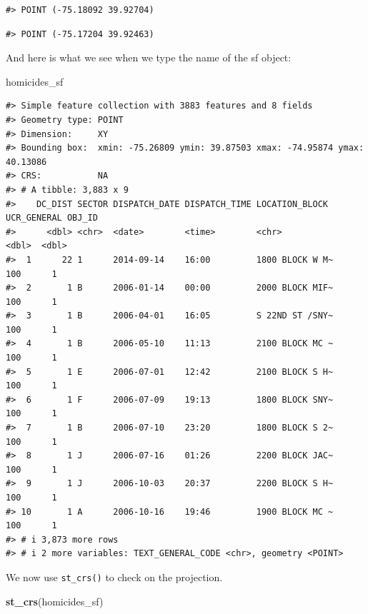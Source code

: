 \documentclass[
]{book}
\newenvironment{Shaded}{\begin{snugshade}}{\end{snugshade}}
\newcommand{\FunctionTok}[1]{\textcolor[rgb]{0.13,0.29,0.53}{\textbf{#1}}}
\newcommand{\NormalTok}[1]{#1}
\begin{document}
\begin{verbatim}
#> POINT (-75.18092 39.92704)
\end{verbatim}

\begin{verbatim}
#> POINT (-75.17204 39.92463)
\end{verbatim}

And here is what we see when we type the name of the sf object:

\begin{Shaded}
\begin{Highlighting}[]
\NormalTok{homicides\_sf}
\end{Highlighting}
\end{Shaded}

\begin{verbatim}
#> Simple feature collection with 3883 features and 8 fields
#> Geometry type: POINT
#> Dimension:     XY
#> Bounding box:  xmin: -75.26809 ymin: 39.87503 xmax: -74.95874 ymax: 40.13086
#> CRS:           NA
#> # A tibble: 3,883 x 9
#>    DC_DIST SECTOR DISPATCH_DATE DISPATCH_TIME LOCATION_BLOCK  UCR_GENERAL OBJ_ID
#>      <dbl> <chr>  <date>        <time>        <chr>                 <dbl>  <dbl>
#>  1      22 1      2014-09-14    16:00         1800 BLOCK W M~         100      1
#>  2       1 B      2006-01-14    00:00         2000 BLOCK MIF~         100      1
#>  3       1 B      2006-04-01    16:05         S 22ND ST /SNY~         100      1
#>  4       1 B      2006-05-10    11:13         2100 BLOCK MC ~         100      1
#>  5       1 E      2006-07-01    12:42         2100 BLOCK S H~         100      1
#>  6       1 F      2006-07-09    19:13         1800 BLOCK SNY~         100      1
#>  7       1 B      2006-07-10    23:20         1800 BLOCK S 2~         100      1
#>  8       1 J      2006-07-16    01:26         2200 BLOCK JAC~         100      1
#>  9       1 J      2006-10-03    20:37         2200 BLOCK S H~         100      1
#> 10       1 A      2006-10-16    19:46         1900 BLOCK MC ~         100      1
#> # i 3,873 more rows
#> # i 2 more variables: TEXT_GENERAL_CODE <chr>, geometry <POINT>
\end{verbatim}

We now use \texttt{st\_crs()} to check on the projection.

\begin{Shaded}
\begin{Highlighting}[]
\FunctionTok{st\_crs}\NormalTok{(homicides\_sf)}
\end{Highlighting}
\end{Shaded}
\end{document}
